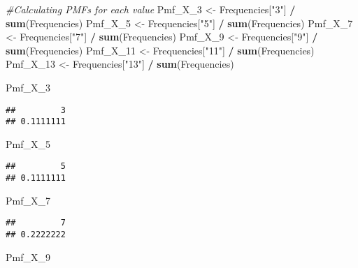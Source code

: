 \documentclass[
]{article}
\newenvironment{Shaded}{\begin{snugshade}}{\end{snugshade}}
\newcommand{\CommentTok}[1]{\textcolor[rgb]{0.56,0.35,0.01}{\textit{#1}}}
\newcommand{\FunctionTok}[1]{\textcolor[rgb]{0.13,0.29,0.53}{\textbf{#1}}}
\newcommand{\NormalTok}[1]{#1}
\newcommand{\OtherTok}[1]{\textcolor[rgb]{0.56,0.35,0.01}{#1}}
\newcommand{\SpecialCharTok}[1]{\textcolor[rgb]{0.81,0.36,0.00}{\textbf{#1}}}
\newcommand{\StringTok}[1]{\textcolor[rgb]{0.31,0.60,0.02}{#1}}
\begin{document}
\begin{Shaded}
\begin{Highlighting}[]
\CommentTok{\#Calculating PMFs for each value}
\NormalTok{Pmf\_X\_3 }\OtherTok{\textless{}{-}}\NormalTok{ Frequencies[}\StringTok{"3"}\NormalTok{] }\SpecialCharTok{/} \FunctionTok{sum}\NormalTok{(Frequencies)}
\NormalTok{Pmf\_X\_5 }\OtherTok{\textless{}{-}}\NormalTok{ Frequencies[}\StringTok{"5"}\NormalTok{] }\SpecialCharTok{/} \FunctionTok{sum}\NormalTok{(Frequencies)}
\NormalTok{Pmf\_X\_7 }\OtherTok{\textless{}{-}}\NormalTok{ Frequencies[}\StringTok{"7"}\NormalTok{] }\SpecialCharTok{/} \FunctionTok{sum}\NormalTok{(Frequencies)}
\NormalTok{Pmf\_X\_9 }\OtherTok{\textless{}{-}}\NormalTok{ Frequencies[}\StringTok{"9"}\NormalTok{] }\SpecialCharTok{/} \FunctionTok{sum}\NormalTok{(Frequencies)}
\NormalTok{Pmf\_X\_11 }\OtherTok{\textless{}{-}}\NormalTok{ Frequencies[}\StringTok{"11"}\NormalTok{] }\SpecialCharTok{/} \FunctionTok{sum}\NormalTok{(Frequencies)}
\NormalTok{Pmf\_X\_13 }\OtherTok{\textless{}{-}}\NormalTok{ Frequencies[}\StringTok{"13"}\NormalTok{] }\SpecialCharTok{/} \FunctionTok{sum}\NormalTok{(Frequencies)}

\NormalTok{Pmf\_X\_3}
\end{Highlighting}
\end{Shaded}

\begin{verbatim}
##         3 
## 0.1111111
\end{verbatim}

\begin{Shaded}
\begin{Highlighting}[]
\NormalTok{Pmf\_X\_5 }
\end{Highlighting}
\end{Shaded}

\begin{verbatim}
##         5 
## 0.1111111
\end{verbatim}

\begin{Shaded}
\begin{Highlighting}[]
\NormalTok{Pmf\_X\_7}
\end{Highlighting}
\end{Shaded}

\begin{verbatim}
##         7 
## 0.2222222
\end{verbatim}

\begin{Shaded}
\begin{Highlighting}[]
\NormalTok{Pmf\_X\_9}
\end{Highlighting}
\end{Shaded}
\end{document}
